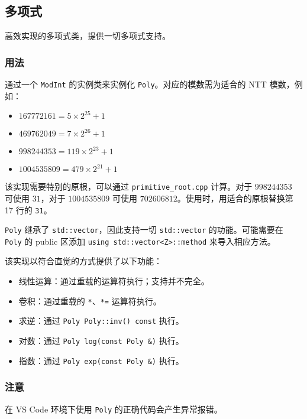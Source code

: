 \subsection{多项式}

高效实现的多项式类，提供一切多项式支持。

\subsubsection{用法}

通过一个 \lstinline{ModInt} 的实例类来实例化 \lstinline{Poly}。对应的模数需为适合的 NTT 模数，例如：

\begin{itemize}
\item $167772161 = 5 \times 2^{25} + 1$
\item $469762049 = 7 \times 2^{26} + 1$
\item $998244353 = 119 \times 2^{23} + 1$
\item $1004535809 = 479 \times 2^{21} + 1$
\end{itemize}

该实现需要特别的原根，可以通过 \lstinline{primitive_root.cpp} 计算。对于 $998244353$ 可使用 $31$，对于 $1004535809$ 可使用 $702606812$。使用时，用适合的原根替换第 17 行的 \lstinline{31}。

\lstinline{Poly} 继承了 \lstinline{std::vector}，因此支持一切 \lstinline{std::vector} 的功能。可能需要在 \lstinline{Poly} 的 public 区添加 \lstinline{using std::vector<Z>::method} 来导入相应方法。

该实现以符合直觉的方式提供了以下功能：

\begin{itemize}
\item 线性运算：通过重载的运算符执行；支持并不完全。
\item 卷积：通过重载的 \lstinline{*}、\lstinline{*=} 运算符执行。
\item 求逆：通过 \lstinline{Poly Poly::inv() const} 执行。
\item 对数：通过 \lstinline{Poly log(const Poly &)} 执行。
\item 指数：通过 \lstinline{Poly exp(const Poly &)} 执行。
\end{itemize}

\subsubsection{注意}

在 VS Code 环境下使用 \lstinline{Poly} 的正确代码会产生异常报错。

